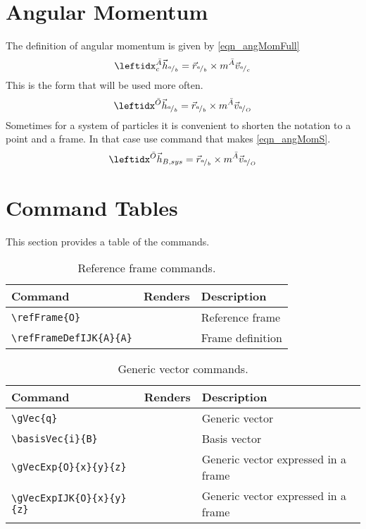 \documentclass{article}
\begin{document}
	\section{Angular Momentum}
	The definition of angular momentum is given by \ref{eqn_angMomFull}
	\begin{equation}
	\label{eqn_angMomFull}
	\angMomFull{A}{h}{c}{a}{b} = \posVecP{r}{a}{b} \times m\velVecP{A}{v}{a}{c}
	\end{equation}
	This is the form that will be used more often.
	\begin{equation}
	\label{eqn_angMom}
	\angMom{O}{h}{a}{b} = \posVecP{r}{a}{b} \times m\velVecP{A}{v}{a}{O}
	\end{equation}
	Sometimes for a system of particles it is convenient to shorten the notation to a point and a frame. In that case use command that makes \ref{eqn_angMomS}.
	\begin{equation}
	\label{eqn_angMomS}
	\angMomS{O}{h}{B,sys} = \posVecP{r}{a}{b} \times m\velVecP{A}{v}{a}{O}
	\end{equation}
	
	\section{Command Tables}
	This section provides a table of the commands.
	
	\begin{table}[h!]
		\caption{Reference frame commands.}
	\begin{tabular}[]{ p{1.75in} | p{1.25in} | p{3in} }	
		\hline	
		\textbf{Command} & \textbf{Renders} & \textbf{Description} \\ 
		\hline
		\verb|\refFrame{O}| & {O} & Reference frame \\
		\verb|\refFrameDefIJK{A}{A}| & {A}{A} & Frame definition \\
		\hline		
	\end{tabular}
	\end{table}
	
	\begin{table}[h!]
		\caption{Generic vector commands.}
		\begin{tabular}[]{ p{1.75in} | p{1.25in} | p{3in} }	
			\hline	
			\textbf{Command} & \textbf{Renders} & \textbf{Description} \\ 
			\hline
			\verb|\gVec{q}| & \gVec{q} & Generic vector \\  
			\verb|\basisVec{i}{B}| & \basisVec{i}{B} & Basis vector \\
			\verb|\gVecExp{O}{x}{y}{z}| & \gVecExp{O}{x}{y}{z} & Generic vector expressed in a frame \\
			\verb|\gVecExpIJK{O}{x}{y}{z}| & \gVecExpIJK{O}{x}{y}{z} & Generic vector expressed in a frame \\
			\hline		
		\end{tabular}
	\end{table}
	
\end{document}
